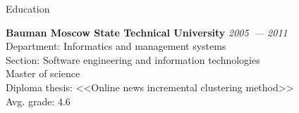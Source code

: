 \documentclass{resume} %
\begin{document}

\begin{rSection}{Education}

{\bf Bauman Moscow State Technical University} \hfill {\em 2005~--- 2011} \\
Department: Informatics and management systems \\ 
Section: Software engineering and information technologies \\
Master of science \\
Diploma thesis: <<Online news incremental clustering method>> \\
Avg. grade: 4.6

\end{rSection}

\end{document}
